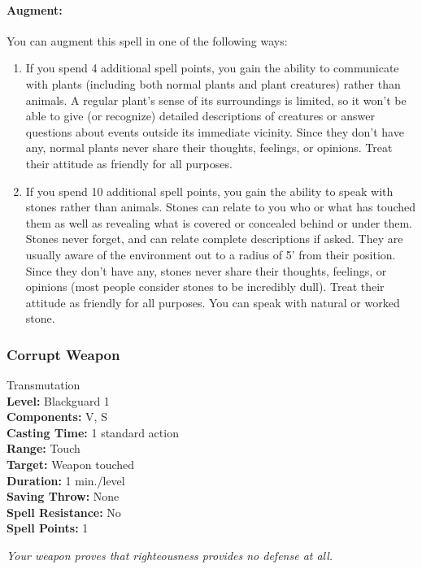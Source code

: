 \paragraph{Augment:} You can augment this spell in one of the following ways:
\begin{enumerate}
 \item If you spend 4 additional spell points, you gain the ability to communicate with plants (including both normal plants and plant creatures) rather than animals. 
 A regular plant's sense of its surroundings is limited, so it won't be able to give (or recognize) detailed descriptions of creatures or answer questions about events outside its immediate vicinity. Since they don't have any, normal plants never share their thoughts, feelings, or opinions. Treat their attitude as friendly for all purposes.
  \item If you spend 10 additional spell points, you gain the ability to speak with stones rather than animals. Stones can relate to you who or what has touched them as well as revealing what is covered or concealed behind or under them. Stones never forget, and can relate complete descriptions if asked. They are usually aware of the environment out to a radius of 5' from their position. Since they don't have any, stones never share their thoughts, feelings, or opinions (most people consider stones to be incredibly dull). Treat their attitude as friendly for all purposes. You can speak with natural or worked stone.
\end{enumerate}
\subsubsection{Corrupt Weapon}
\label{Spell:CorruptWeapon}
Transmutation
\\ \textbf{Level:} Blackguard 1
\\ \textbf{Components:} V, S
\\ \textbf{Casting Time:} 1 standard action
\\ \textbf{Range:} Touch
\\ \textbf{Target:} Weapon touched
\\ \textbf{Duration:} 1 min./level
\\ \textbf{Saving Throw:} None
\\ \textbf{Spell Resistance:} No
\\ \textbf{Spell Points:} 1

\emph{Your weapon proves that righteousness provides no defense at all.}

